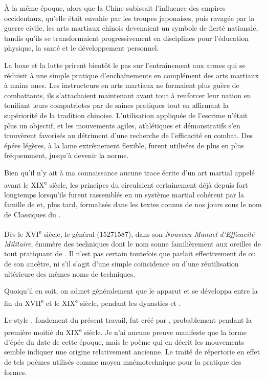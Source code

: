 \`{A} la même époque, alors que la Chine subissait l'influence des empires occidentaux, qu'elle était envahie par les troupes japonaises, puis ravagée par la guerre civile, les arts martiaux chinois devenaient un symbole de fierté nationale, tandis qu'ils se transformaient progressivement en disciplines pour l'éducation physique, la santé et le développement personnel.

La boxe et la lutte prirent bientôt le pas sur l'entraînement aux armes qui se réduisit à une simple pratique d'enchaînements en complément des arts martiaux à mains nues.
Les instructeurs en arts martiaux ne formaient plus guère de combattants, ils s'attachaient maintenant avant tout à renforcer leur nation en tonifiant leurs compatriotes par de saines pratiques tout en affirmant la supériorité de la tradition chinoise.
L'utilisation appliquée de l'escrime n'était plus un objectif, et les mouvements agiles, athlétiques et démonstratifs s'en trouvèrent favorisés au détriment d'une recherche de l'efficacité en combat.
Des épées légères, à la lame extrêmement flexible, furent utilisées de plus en plus fréquemment, jusqu'à devenir la norme.

Bien qu'il n'y ait à ma connaissance aucune trace écrite d'un art martial appelé \Taijiquan{} avant le XIX\textsuperscript{e} siècle, les principes du \Taiji{} circulaient certainement déjà depuis fort longtemps lorsqu'ils furent rassemblés en un système martial cohérent par la famille \Chen{} de \Chenjiagou{} et, plus tard, formalisés dans les textes connus de nos jours sous le nom de Classiques du \Taiji{}.

Dès le XVI\textsuperscript{e} siècle, le général \QiJiguang{} (1527\textendash{}1587), dans son \textit{Nouveau Manuel d'Efficacité Militaire}, énumère des techniques dont le nom sonne familièrement aux oreilles de tout pratiquant de \Taijiquan{}. Il n'est pas certain toutefois que \QiJiguang{} parlait effectivement de \Taijiquan{} ou de son ancêtre, ni s'il  s'agit d'une simple coïncidence ou d'une réutilisation ultérieure des mêmes noms de techniques.

Quoiqu'il en soit, on admet généralement que le \Taijiquan{} apparut et se développa entre la fin du XVII\textsuperscript{e} et le XIX\textsuperscript{e} siècle, pendant les dynasties \Ming{} et \Qing{}.

Le style \Yangjia{} \Michuan{}, fondement du présent travail, fut créé par \Yang{} \Luchan{}, probablement pendant la première moitié du XIX\textsuperscript{e} siècle.
Je n'ai aucune preuve manifeste que la forme d'épée \Kunlun{} du \Yangjia{} \Michuan{} date de cette époque, mais le poème qui en décrit les mouvements semble indiquer une origine relativement ancienne.
Le traité de \QiJiguang{} répertorie en effet de tels poèmes utilisés comme moyen mnémotechnique pour la pratique des formes.

